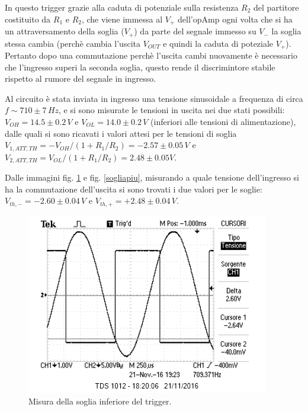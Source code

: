 \documentclass[10pt,a4paper]{article}
\begin{document}
In questo trigger grazie alla caduta di potenziale sulla resistenza $R_2$ del partitore costituito da $R_1$ e $R_2$, che viene immessa al $V_{+}$ dell'opAmp ogni volta che si ha un attraversamento della soglia ($V_{+}$) da parte del segnale immesso su $V_{-}$ la soglia stessa cambia (perchè cambia l'uscita $V_{OUT}$ e quindi la caduta di poteziale $V_{+}$). Pertanto dopo una commutazione perchè l'uscita cambi nuovamente è necessario che l'ingresso superi la seconda soglia, questo rende il discrimintore stabile rispetto al rumore del segnale in ingresso.

Al circuito è stata inviata in ingresso una tensione sinusoidale a frequenza di circa $f \sim 710 \pm 7 \, Hz$, e si sono misurate le tensioni in uscita nei due stati possibili: $V_{OH} = 14.5\pm 0.2 \, V$ e $V_{OL} = 14.0\pm0.2 \, V$ (inferiori alle tensioni di alimentazione), dalle quali si sono ricavati i valori attesi per le tensioni di soglia $V_{1,ATT,TH}= -V_{OH}/(1+R_1/R_2)= -2.57 \pm 0.05 \, V$ e $V_{2,ATT,TH}= V_{OL}/(1+R_1/R_2) = 2.48 \pm 0.05 V$. 

Dalle immagini fig. \ref{sogliameno} e fig. \ref{sogliapiu}, misurando a quale tensione dell'ingresso si ha la commutazione dell'uscita si sono trovati i due valori per le soglie: $V_{th, -} =-2.60 \pm 0.04 \, V $ e $V_{th, +} = +2.48 \pm 0.04 \, V$.

\begin{figure}[h]
\centering
\includegraphics[scale=1.0]{immagini/FotoRicordoVth1.png}
\caption{Misura della soglia inferiore del trigger.}
\label{sogliameno}
\end{figure}
\end{document}
